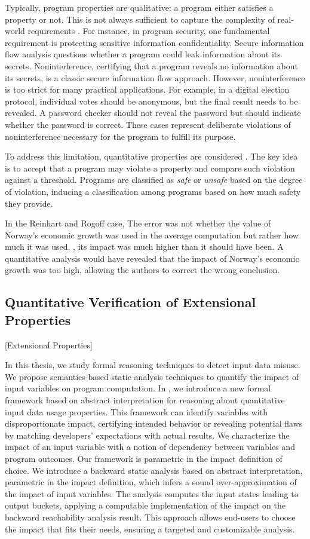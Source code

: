 Typically, program properties are qualitative: a program either satisfies a property or not.
This is not always sufficient to capture the complexity of real-world requirements .
For instance, in program security, one fundamental requirement is protecting sensitive information confidentiality.
Secure information flow analysis questions whether a program could leak information about its secrets.
Noninterference, certifying that a program reveals no information about its secrets, is a classic secure information flow approach.
However, noninterference is too strict for many practical applications.
For example, in a digital election protocol, individual votes should be anonymous, but the final result needs to be revealed.
A password checker should not reveal the password but should indicate whether the password is correct.
These cases represent deliberate violations of noninterference necessary for the program to fulfill its purpose.

To address this limitation, quantitative properties are considered .
The key idea is to accept that a program may violate a property and compare such violation against a threshold.
Programs are classified as \emph{safe} or \emph{unsafe} based on the degree of violation, inducing a classification among programs based on how much safety they provide.

In the Reinhart and Rogoff case,
The error was not whether
the value of Norway's economic growth
was used
in the average computation
but rather how much it was used, \ie,
its impact was much higher than it should have been.
A quantitative analysis would have revealed that the impact of Norway's economic growth was too high, allowing the authors to correct the wrong conclusion.

\subsection{Quantitative Verification of Extensional Properties}[Extensional Properties]


In this thesis, we study formal reasoning techniques to detect input data misuse.
We propose semantics-based static analysis techniques to quantify the impact of input variables on program computation.
In , we introduce a new formal framework based on abstract interpretation for reasoning about quantitative input data usage properties.
This framework can identify variables with disproportionate impact, certifying intended behavior or revealing potential flaws by matching developers' expectations with actual results.
We characterize the impact of an input variable with a notion of dependency between variables and program outcomes.
Our framework is parametric in the impact definition of choice.
%
We introduce a backward static analysis based on abstract interpretation, parametric in the impact definition, which infers a sound over-approximation of the impact of input variables.
The analysis computes the input states leading to output buckets, applying a computable implementation of the impact on the backward reachability analysis result.
This approach allows end-users to choose the impact that fits their needs, ensuring a targeted and customizable analysis.


